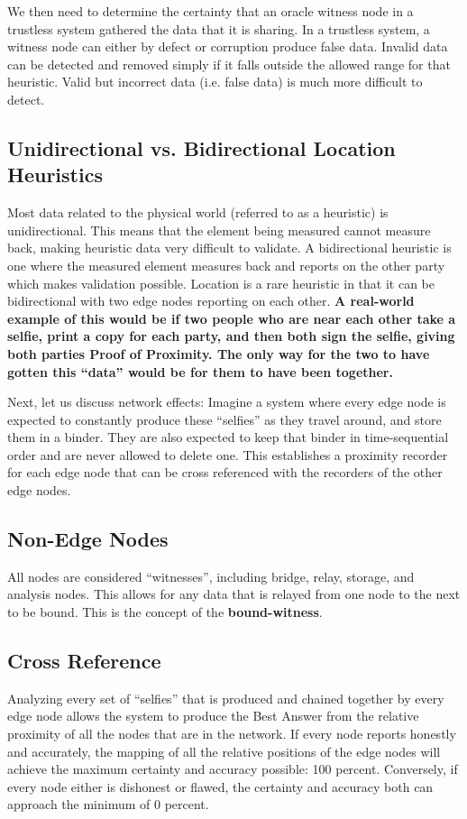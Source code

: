 \documentclass{article}
\begin{document}
We then need to determine the \gls{certainty} that an \gls{oracle} witness node in a trustless system gathered the data that it is sharing. In a trustless system, a witness node can either by defect or corruption produce false data. Invalid data can be detected and removed simply if it falls outside the allowed range for that \gls{heuristic}. Valid but incorrect data (i.e. false data) is much more difficult to detect.

\subsection {Unidirectional vs. Bidirectional Location Heuristics}
Most data related to the physical world (referred to as a heuristic) is unidirectional. This means that the element being measured cannot measure back, making heuristic data very difficult to validate. A bidirectional heuristic is one where the measured element measures back and reports on the other party which makes validation possible. Location is a rare heuristic in that it can be bidirectional with two edge nodes reporting on each other. \textbf{A real-world example of this would be if two people who are near each other take a selfie, print a copy for each party, and then both sign the selfie, giving both parties Proof of Proximity. The only way for the two to have gotten this ``data'' would be for them to have been together.}

Next, let us discuss network effects: Imagine a system where every edge node is expected to constantly produce these ``selfies'' as they travel around, and store them in a binder. They are also expected to keep that binder in time-sequential order and are never allowed to delete one. This establishes a proximity recorder for each edge node that can be cross referenced with the recorders of the other edge nodes.

\subsection {Non-Edge Nodes}
All nodes are considered ``witnesses'', including bridge, relay, storage, and analysis nodes. This allows for any data that is relayed from one node to the next to be bound. This is the concept of the \textbf{\Gls{bound-witness}}.

\subsection {Cross Reference}
Analyzing every set of ``selfies'' that is produced and chained together by every edge node allows the system to produce the Best Answer from the relative proximity of all the nodes that are in the network. If every node reports honestly and accurately, the mapping of all the relative positions of the edge nodes will achieve the maximum \gls{certainty} and \gls{accuracy} possible: 100 percent. Conversely, if every node either is dishonest or flawed, the certainty and accuracy both can approach the minimum of 0 percent.
\end{document}
